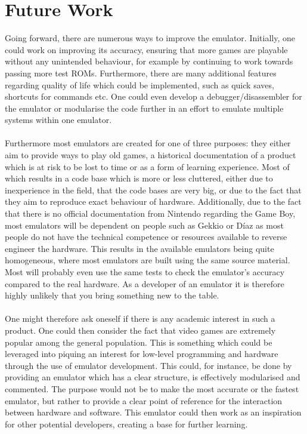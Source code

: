 \section{Future Work}
Going forward, there are numerous ways to improve the emulator. Initially, one could work on improving its accuracy, ensuring that more games are playable without any unintended behaviour, for example by continuing to work towards passing more test ROMs. Furthermore, there are many additional features regarding quality of life which could be implemented, such as quick saves, shortcuts for commands etc. One could even develop a debugger/disassembler for the emulator or modularise the code further in an effort to emulate multiple systems within one emulator.%
\\\\
Furthermore most emulators are created for one of three purposes: they either aim to provide ways to play old games, a historical documentation of a product which is at risk to be lost to time or as a form of learning experience. Most of which results in a code base which is more or less cluttered, either due to inexperience in the field, that the code bases are very big, or due to the fact that they aim to reproduce exact behaviour of hardware. Additionally, due to the fact that there is no official documentation from Nintendo regarding the Game Boy, most emulators will be dependent on people such as Gekkio \cite{Gekkio.fi} or Díaz \cite{TCAGBD} as most people do not have the technical competence or resources available to reverse engineer the hardware. This results in the available emulators being quite homogeneous, where most emulators are built using the same source material. Most will probably even use the same tests to check the emulator's accuracy compared to the real hardware. As a developer of an emulator it is therefore highly unlikely that you bring something new to the table.
\\\\
One might therefore ask oneself if there is any academic interest in such a product. One could then consider the fact that video games are extremely popular among the general population. This is something which could be leveraged into piquing an interest for low-level programming and hardware through the use of emulator development. This could, for instance, be done by providing an emulator which has a clear structure, is effectively modularised and commented. The purpose would not be to make the most accurate or the fastest emulator, but rather to provide a clear point of reference for the interaction between hardware and software. This emulator could then work as an inspiration for other potential developers, creating a base for further learning. 